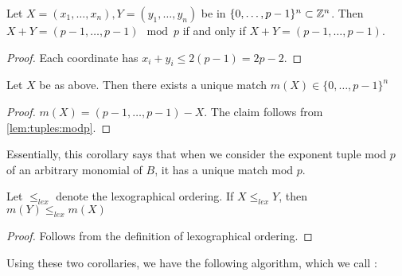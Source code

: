 \begin{lem}
	\label{lem:tuples:modp}
	Let \(X = (x_{1}, \ldots, x_{n}),
	Y = (y_{1}, \ldots, y_{n})\)
	be in \(\{0, \ldots, p-1\}^{n} \subset \mathbb{Z}^{n}\).
	Then \(X + Y = 
	(p-1, \ldots, p-1) \mod p\)
	if and only if 
	\(X + Y = 
	(p-1, \ldots, p-1)\).
\end{lem}

\begin{proof}
	Each coordinate has \(x_{i} + y_{i} \leq 2(p-1) = 2p-2\).
\end{proof}

\begin{cor}
    \label{cor:unique:match}
	Let $X$ be as above.
	Then there exists a unique
	match \(m(X) \in \{0, \ldots, p-1\}^{n}\) 
\end{cor}

\begin{proof}
	\(m(X) = 
	(p-1, \ldots, p-1) - X\).
	The claim follows from 
	\ref{lem:tuples:modp}.
\end{proof}

Essentially, this corollary says that
when we consider the exponent tuple mod $p$ of 
an arbitrary monomial of \(B\),
it has a unique
match mod \(p\).

\begin{cor}
	\label{cor:match:order}
	Let \(\leq_{lex}\) denote the 
	lexographical ordering.
	If \(X \leq_{lex} Y\),
	then 
	\(m(Y) \leq_{lex} m(X)\)
\end{cor}

\begin{proof}
	Follows from the definition of lexographical
	ordering.
\end{proof}

Using these two corollaries, we have the following algorithm,
which we call \merge:


